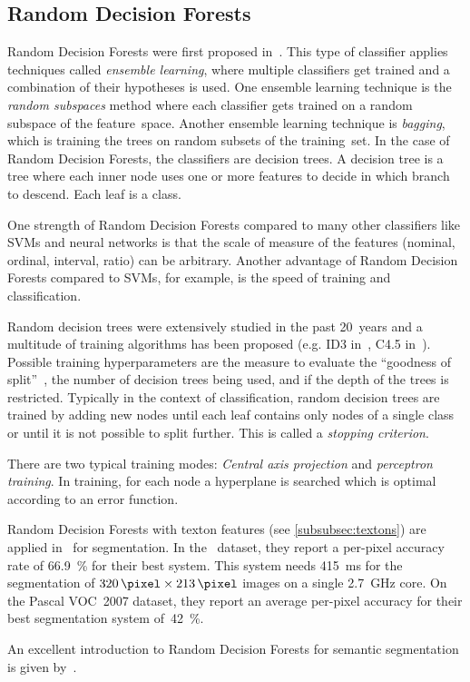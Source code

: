
\subsection{Random Decision Forests}\label{subsec:random-forests}

Random Decision Forests were first proposed in~\cite{ho1995random}. This type
of classifier applies techniques called \textit{ensemble learning}, where
multiple classifiers get trained and a combination of their hypotheses is
used. One ensemble learning technique is the \textit{random subspaces} method
where each classifier gets trained on a random subspace of the feature~space.
Another ensemble learning technique is \textit{bagging}, which is training the
trees on random subsets of the training~set. In the case of Random Decision
Forests, the classifiers are decision trees. A decision tree is a tree where
each inner node uses one or more features to decide in which branch to descend.
Each leaf is a class.

One strength of Random Decision Forests compared to many other classifiers like
\glspl{SVM} and neural networks is that the scale of measure of the features
(nominal, ordinal, interval, ratio) can be arbitrary. Another advantage of
Random Decision Forests compared to \glspl{SVM}, for example, is the speed
of training and classification.

Random decision trees were extensively studied in the past 20~years and a
multitude of training algorithms has been proposed (e.g. ID3
in~\cite{quinlan1986induction}, C4.5 in~\cite{quinlan2014c4}). Possible
training hyperparameters are the measure to evaluate the \enquote{goodness of
split}~\cite{raey89empirical}, the number of decision trees being used, and if
the depth of the trees is restricted. Typically in the context of
classification, random decision trees are trained by adding new nodes until
each leaf contains only nodes of a single class or until it is not possible to
split further. This is called a \textit{stopping criterion}.

There are two typical training modes: \textit{Central axis projection} and
\textit{perceptron training}. In training, for each node a hyperplane is
searched which is optimal according to an error function.

Random Decision Forests with texton features (see \cref{subsubsec:textons}) are
applied in~\cite{shotton2008semantic} for segmentation. In the~\cite{MSCR-db}
dataset, they report a per-pixel accuracy rate of \SI{66.9}{\percent} for their
best system. This system needs \SI{415}{\milli\second} for the segmentation of
$\SI{320}{\pixel} \times \SI{213}{\pixel}$ images on a single
\SI{2.7}{\giga\hertz} core. On the Pascal VOC~2007 dataset, they report an
average per-pixel accuracy for their best segmentation system
of~\SI{42}{\percent}.

An excellent introduction to Random Decision Forests for semantic segmentation
is given by~\cite{schroff2008object}.
